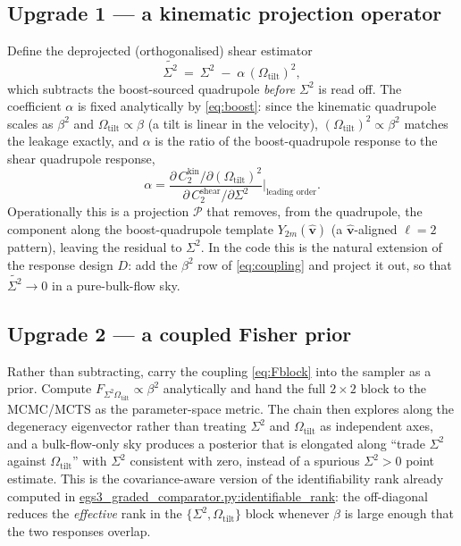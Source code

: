 \documentclass[11pt]{article}
\newcommand{\pathx}[1]{{\small\urlstyle{tt}\url{#1}}}  %
\newcommand{\Sig}{\Sigma^2}
\newcommand{\Otilt}{\Omega_{\mathrm{tilt}}}
\newcommand{\vhat}{\hat{\mathbf v}}
\begin{document}
\subsection{Upgrade 1 --- a kinematic projection operator}
Define the deprojected (orthogonalised) shear estimator
\begin{equation}
  \widetilde{\Sig}\ =\ \Sig \;-\; \alpha\,(\Otilt)^2 ,
  \label{eq:proj}
\end{equation}
which subtracts the boost-sourced quadrupole \emph{before} $\Sig$ is read off.
The coefficient $\alpha$ is fixed analytically by \eqref{eq:boost}: since the
kinematic quadrupole scales as $\beta^2$ and $\Otilt\propto\beta$ (a tilt is
linear in the velocity), $(\Otilt)^2\propto\beta^2$ matches the leakage exactly,
and $\alpha$ is the ratio of the boost-quadrupole response to the shear
quadrupole response,
\begin{equation}
  \alpha
  =\frac{\partial\,C_2^{\mathrm{kin}}/\partial(\Otilt)^2}
        {\partial\,C_2^{\mathrm{shear}}/\partial\Sig}\Bigg|_{\text{leading order}} .
\end{equation}
Operationally this is a projection $\mathcal P$ that removes, from the
quadrupole, the component along the boost-quadrupole template
$Y_{2m}(\vhat)$ (a $\vhat$-aligned $\ell=2$ pattern), leaving the residual to
$\Sig$. In the code this is the natural extension of the response design $D$:
add the $\beta^2$ row of \eqref{eq:coupling} and project it out, so that
$\widetilde{\Sig}\to 0$ in a pure-bulk-flow sky.

\subsection{Upgrade 2 --- a coupled Fisher prior}
Rather than subtracting, carry the coupling \eqref{eq:Fblock} into the sampler as
a prior. Compute $F_{\Sig\Otilt}\propto\beta^2$ analytically and hand the full
$2\times2$ block to the MCMC/MCTS as the parameter-space metric. The chain then
explores along the degeneracy eigenvector rather than treating $\Sig$ and
$\Otilt$ as independent axes, and a bulk-flow-only sky produces a posterior that
is elongated along ``trade $\Sig$ against $\Otilt$'' with $\Sig$ consistent with
zero, instead of a spurious $\Sig>0$ point estimate. This is the
covariance-aware version of the identifiability rank already computed in
\pathx{egs3_graded_comparator.py:identifiable_rank}: the off-diagonal reduces
the \emph{effective} rank in the $\{\Sig,\Otilt\}$ block whenever $\beta$ is
large enough that the two responses overlap.
\end{document}
